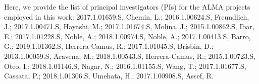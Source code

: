 \begin{table}[htbp!]
\begin{center}
{Here, we provide the list of principal investigators (PIs) for the ALMA projects employed in this work: 2017.1.01659.S, Chemin, L.; 2016.1.00624.S, Freundlich, J.; 2017.1.00471.S, Hayashi, M.; 2017.1.01674.S, Molina, J.; 2015.1.00862.S, Ibar, E.; 2017.1.01228.S, Noble, A.; 2018.1.00974.S, Noble, A.; 2017.1.00413.S, Barro, G.; 2019.1.01362.S, Herrera-Camus, R.; 2017.1.01045.S,  Brisbin, D.; 2013.1.00059.S, Aravena, M.; 2018.1.00543.S, Herrera-Camus, R.; 2015.1.00723.S, Oteo, I.; 2018.1.01146.S, Nagar, N.; 2016.1.01155.S, Wang, T.; 2017.1.01677.S, Cassata, P.; 2018.1.01306.S, Umehata, H.; 2017.1.00908.S, Assef, R.}
\end{center}
\end{table}
